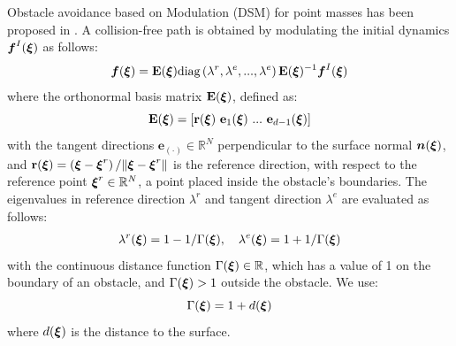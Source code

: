\documentclass[conference]{IEEEtran}
\begin{document}
Obstacle avoidance based on Modulation (DSM) for point masses has been proposed in \cite{huber2022avoiding, huber2022fast}. A collision-free path is obtained by modulating the initial dynamics $\boldsymbol{f}^I(\boldsymbol{\xi})$ as follows:
\begin{equation}
  \vecs f(\vecs \xi) = \textbf{E}(\vecs \xi) \text{diag} \left(\lambda^r, \lambda^e, ..., \lambda^e \right) \textbf{E}(\vecs{\xi})^{-1} \vect f^I(\vecs \xi)
  \label{eq:modulated} 
\end{equation}
where the orthonormal basis matrix $\textbf{E}(\boldsymbol{\xi})$, defined as:
\begin{equation}
\textbf{E}(\vecs \xi) = \left[ \textbf{r}(\vecs \xi) \ \textbf{e}_1(\vecs \xi) \ ... \ \textbf{e}_{d-1}(\vecs \xi) \right]
\label{eq:matrix_E}
\end{equation}
with the tangent directions $\textbf{e}_{(\cdot)} \in \mathbb{R}^N$ perpendicular to the surface normal $\boldsymbol{n}(\boldsymbol{\xi})$, and $\textbf{r}(\boldsymbol{\xi}) =  \left( \boldsymbol{\xi}-\boldsymbol{\xi}^r \right) / \| \boldsymbol{\xi}-\boldsymbol{\xi} ^r \|$ is the reference direction, with respect to the reference point $\boldsymbol{\xi}^r \in \mathbb{R}^N$, a point placed inside the obstacle's boundaries.
The eigenvalues in reference direction  $\lambda^r$ and tangent direction $\lambda^e$ are evaluated as follows:
\begin{equation}
\begin{split}
    \lambda^r(\vecs \xi) = 1 - 1 /\Gamma(\vecs \xi) , \quad \lambda^e(\vecs \xi) = 1 + 1 / \Gamma(\vecs \xi)
    \label{eq:eigenvalues}
    \end{split}
\end{equation}
with the continuous distance function $\Gamma(\boldsymbol{\xi}) \in \mathbb{R}$, which has a value of 1 on the boundary of an obstacle, and $\Gamma(\boldsymbol{\xi}) > 1$ outside the obstacle. We use:
\begin{equation}
  \Gamma(\boldsymbol{\xi}) = 1 + d (\boldsymbol{\xi})
\end{equation}
where $d (\boldsymbol{\xi})$ is the distance to the surface.
\end{document}
